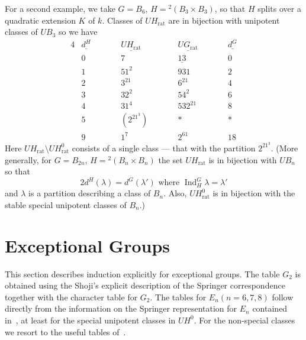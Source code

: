\documentclass{amsart}
\newcommand\Ind	{\operatorname{Ind}}
\newcommand\lam	{\lambda}
\newcommand\UHo	{UH^0}
\begin{document}
For a second example, we take $G = B_6$, $H = {}^2(B_3 \times
B_3)$, so that
$H$ splits over a quadratic extension $K$ of $k$.  Classes of 
$UH_{\text{rat}}$ are in bijection with unipotent classes of
$UB_3$ so we have
     \begin{alignat*} {4}
     &\underline{d^H} &\qquad &\underline{UH_{\text{rat}}}
&\qquad
          &\underline{UG_{\text{rat}}} &\qquad &\underline{d^G}
\\
     &0 &\qquad &7 &\qquad &\underline{13} &\qquad &0 \\
     &1 &\qquad &51^2 &\qquad &931 &\qquad &2 \\
     &2 &\qquad &3^21 &\qquad &6^21 &\qquad &4 \\
     &3 &\qquad &32^2 &\qquad &54^2 &\qquad &6 \\
     &4 &\qquad &31^4 &\qquad &532^21 &\qquad &8 \\
     &5 &\qquad &(2^21^3) &\qquad &* &\qquad &* \\
     &9 &\qquad &1^7 &\qquad &2^61 &\qquad &18
     \end{alignat*}
Here $UH_{\text{rat}} \setminus UH_{\text{rat}}^0$ consists of a
single class
--- that with the partition $2^21^3$.  (More generally, for $G =
B_{2n}$,
$H = {}^2(B_n \times B_n)$ the set $UH_{\text{rat}}$ is in
bijection with
$UB_n$ so that
     $$
     2d^H(\lam) = d^G(\lam') \text{ where } \Ind_H^G \lam = \lam'
     $$
and $\lam$ is a partition describing a class of $B_n$.  Also, 
$UH_{\text{rat}}^0$ is in bijection with the stable special
unipotent
classes of $B_n$.)


\section{Exceptional Groups} %

\bigskip

This section describes induction explicitly for exceptional
groups.  The
table $G_2$ is obtained using the Shoji's explicit description
of the Springer correspondence together with the character table
for $G_2$.  
The tables for $E_n (n = 6,7,8)$ follow directly from the
information on the Springer representation for $E_n$ contained 
in~\cite{AL}, at least for the special unipotent classes in
$\UHo$.
For the non-special classes we resort to the useful tables
of~\cite{A}.
\end{document}
